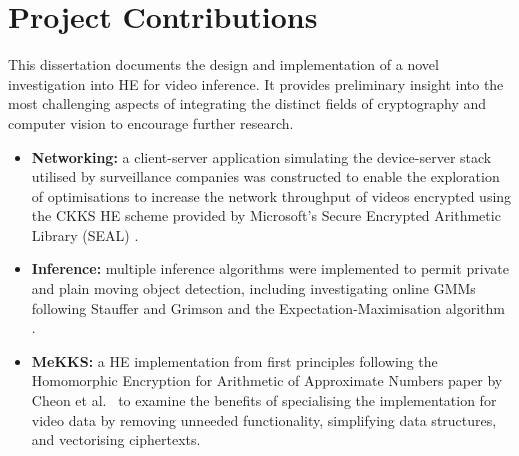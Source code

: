 





\section{Project Contributions}
\label{sec:projectContributions}
\indent \indent
This dissertation documents the design and implementation of a novel investigation into HE for video inference. It provides preliminary insight into the most challenging aspects of integrating the distinct fields of cryptography and computer vision to encourage further research. 
\begin{itemize}
    \item \textbf{Networking:} a client-server application simulating the device-server stack utilised by surveillance companies was constructed to enable the exploration of optimisations to increase the network throughput of videos encrypted using the CKKS HE scheme \cite{CKKS} provided by Microsoft's Secure Encrypted Arithmetic Library (SEAL) \cite{SEAL}.
    \item \textbf{Inference:} multiple inference algorithms were implemented to permit private and plain moving object detection, including investigating online GMMs following Stauffer and Grimson \cite{Stauffer} and the Expectation-Maximisation algorithm \cite{Dempster}.
    \item \textbf{MeKKS:} a HE implementation from first principles following the Homomorphic Encryption for Arithmetic of Approximate Numbers paper by Cheon et al.\ \cite{CKKS, BootstrappingHEAAN} to examine the benefits of specialising the implementation for video data by removing unneeded functionality, simplifying data structures, and vectorising ciphertexts.
\end{itemize}
